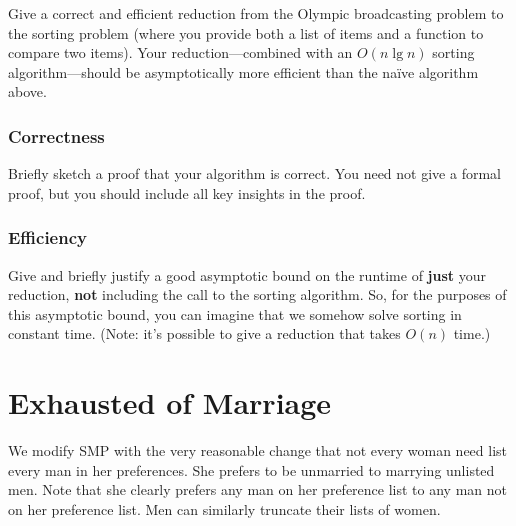 \documentclass[11pt, oneside]{article}   	%
\theoremstyle{definition}
\theoremstyle{remark}
\begin{document}
Give a correct and efficient reduction from the Olympic broadcasting
problem to the sorting problem (where you provide both a list of items
and a function to compare two items). Your reduction---combined with
an $O(n \lg n)$ sorting algorithm---should be asymptotically more
efficient than the na\"ive algorithm above.
\subsubsection{Correctness}

Briefly sketch a proof that your algorithm is correct. You need not
give a formal proof, but you should include all key insights in the
proof.
\subsubsection{Efficiency}

Give and briefly justify a good asymptotic bound on the runtime
of \textbf{just} your reduction, \textbf{not} including the call to the sorting
algorithm. So, for the purposes of this asymptotic bound, you can
imagine that we somehow solve sorting in constant time. (Note: it's
possible to give a reduction that takes $O(n)$ time.)


\cleardoublepage
\section{Exhausted of Marriage}

We modify SMP with the very reasonable change that not every woman
need list every man in her preferences. She prefers to be unmarried to
marrying unlisted men. Note that she clearly prefers any man on her
preference list to any man not on her preference list. Men can
similarly truncate their lists of women.
\end{document}

